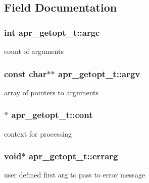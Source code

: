 \subsection{Field Documentation}
\subsubsection[{\texorpdfstring{argc}{argc}}]{\setlength{\rightskip}{0pt plus 5cm}int apr\+\_\+getopt\+\_\+t\+::argc}\hypertarget{structapr__getopt__t_a58aeb33137aabdd5a00efbde05652094}{}\label{structapr__getopt__t_a58aeb33137aabdd5a00efbde05652094}
count of arguments 
\subsubsection[{\texorpdfstring{argv}{argv}}]{\setlength{\rightskip}{0pt plus 5cm}const char$\ast$$\ast$ apr\+\_\+getopt\+\_\+t\+::argv}\hypertarget{structapr__getopt__t_a296c27d8db2fe6d4b88c5c7a85c40c02}{}\label{structapr__getopt__t_a296c27d8db2fe6d4b88c5c7a85c40c02}
array of pointers to arguments 
\subsubsection[{\texorpdfstring{cont}{cont}}]{$\ast$ apr\+\_\+getopt\+\_\+t\+::cont}\hypertarget{structapr__getopt__t_a63a073fb9c11bb2713b3d7f967e95a24}{}\label{structapr__getopt__t_a63a073fb9c11bb2713b3d7f967e95a24}
context for processing 
\subsubsection[{\texorpdfstring{errarg}{errarg}}]{\setlength{\rightskip}{0pt plus 5cm}void$\ast$ apr\+\_\+getopt\+\_\+t\+::errarg}\hypertarget{structapr__getopt__t_a46db55c58789ab7fa99bb49544b0776e}{}\label{structapr__getopt__t_a46db55c58789ab7fa99bb49544b0776e}
user defined first arg to pass to error message 
